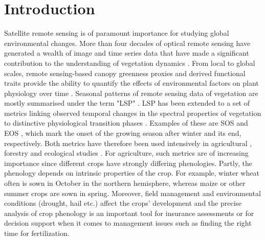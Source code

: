 \section{Introduction}
\label{sec:unc_introduction}
Satellite remote sensing is of paramount importance for studying global environmental changes. More than four decades of optical remote sensing have generated a wealth of image and time series data that have made a significant contribution to the understanding of vegetation dynamics \citep{gonsamo_circumpolar_2016,caparros-santiago_land_2021, wu_development_2021}. From local to global scales, remote sensing-based canopy greenness proxies \citep{myneni_interpretation_1995} and derived functional traits \citep{verhoef_remote_2003,homolova_review_2013} provide the ability to quantify the effects of environmental factors on plant physiology over time \citep{melaas_detecting_2013,bolton_continental-scale_2020,croft_global_2020,tian_calibrating_2021}. Seasonal patterns of remote sensing data of vegetation are mostly summarised under the term "\gls{LSP}" \citep{de_beurs_land_2004}. \gls{LSP} has been extended to a set of metrics linking observed temporal changes in the spectral properties of vegetation to distinctive physiological transition phases \citep{zeng_review_2020}. Examples of these are \gls{SOS} and \gls{EOS} \citep{lloyd_phenological_1990,reed_measuring_1994}, which mark the onset of the growing season after winter and its end, respectively. Both metrics have therefore been used intensively in agricultural \citep{sakamoto_crop_2005,meroni_phenology-based_2014,gao_toward_2017,diao_remote_2020,salinero-delgado_monitoring_2022}, forestry \citep{melaas_detecting_2013,white_remote_2014,kowalski_characterizing_2020,shen_regional_2021} and ecological studies \citep{wagenseil_assessing_2006,gu_characterizing_2009,vrieling_vegetation_2018,moon_multiscale_2021}. For agriculture, such metrics are of increasing importance since different crops have strongly differing phenologies. Partly, the phenology depends on intrinsic properties of the crop. For example, winter wheat often is sown in October in the northern hemisphere, whereas maize or other summer crops are sown in spring. Moreover, field management and environmental conditions (drought, hail etc.) affect the crops' development and the precise analysis of crop phenology is an important tool for insurance assessments or for decision support when it comes to management issues such as finding the right time for fertilization.

